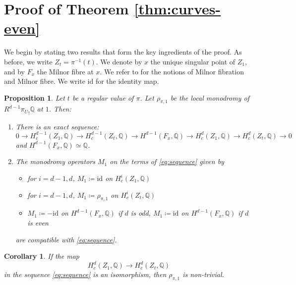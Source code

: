 \documentclass[11pt, reqno]{amsart}
\theoremstyle{plain}
\newtheorem{cor}[thm]{Corollary}
\newtheorem{prop}[thm]{Proposition}
\theoremstyle{definition}
\newcommand{\QQ}{\mathbb{Q}}
\begin{document}
\section{Proof of Theorem \ref{thm:curves-even}}
\label{sec:proof-thm-2}
We begin by stating two results that form the key ingredients of the proof.
As before, we write $Z_t=\pi^{-1}(t)$.
We denote by $x$ the unique singular point of $Z_1$, and by $F_x$ the Milnor fibre at $x$. 
We refer to \cite{Milnor} for the notions of Milnor fibration and Milnor fibre.
We write $\mathrm{id}$ for the identity map.


\begin{prop} 
\label{pro:pro-sequence} 
Let $t$ be a regular value of $\pi$. Let $\rho_{\pi,1}$ be the local monodromy of $R^{d-1} {\pi_U}_{ !}  \QQ$ at $1$. Then:
\begin{enumerate}
\item[(i)] There is an exact sequence: 
\begin{equation}
\label{eq:sequence}
0 \to H^{d-1}_c(Z_1, \QQ) \to H^{d-1}_c(Z_t, \QQ) \to H^{d-1}(F_x, \QQ) \to H^d_c(Z_1, \QQ) \to H^d_c(Z_t, \QQ) \to 0
\end{equation} and  $H^{d-1}(F_x, \QQ)\simeq \QQ$.
\item[(ii)] 
The monodromy operators $M_1$ on the terms of \eqref{eq:sequence} given by
\begin{itemize}
\item for $i=d-1,d$, $M_1\coloneqq \mathrm{id}$ on $H^{i}_c(Z_1, \QQ)$
\item for $i=d-1,d$, $M_1\coloneqq \rho_{\pi, 1}$ on $H^{i}_c(Z_t, \QQ)$
\item $M_1\coloneqq-\mathrm{id}$ on $H^{d-1}(F_x, \QQ)$ if $d$ is odd, $M_1\coloneqq\mathrm{id}$ on $H^{d-1}(F_x, \QQ)$ if $d$ is even
\end{itemize}
are compatible with  \eqref{eq:sequence}.
\end{enumerate}
\end{prop}

\begin{cor}
\label{cor:if-iso}
If the map 
\begin{equation}
\label{eq:sp_d}
 	H^d_c(Z_1, \QQ) \to H^d_c(Z_t,  \QQ)
 \end{equation}
in the sequence \eqref{eq:sequence} is an isomorphism, then $\rho_{\pi,1}$ is non-trivial.  
\end{cor}
\end{document}
